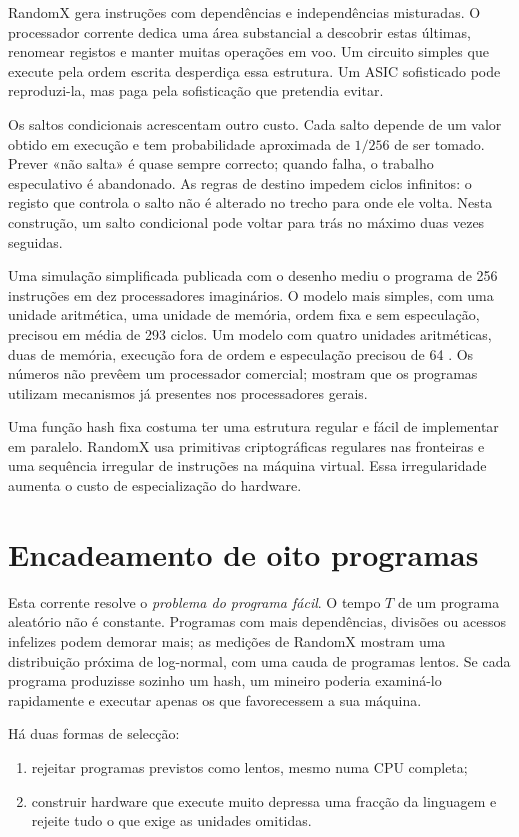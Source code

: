 RandomX gera instruções com dependências e independências misturadas. O
processador corrente dedica uma área substancial a descobrir estas últimas,
renomear registos e manter muitas operações em voo. Um circuito simples que
execute pela ordem escrita desperdiça essa estrutura. Um ASIC sofisticado
pode reproduzi-la, mas paga pela sofisticação que pretendia evitar.

Os saltos condicionais acrescentam outro custo. Cada salto depende de um
valor obtido em execução e tem probabilidade aproximada de \(1/256\) de ser
tomado. Prever «não salta» é quase sempre correcto; quando falha, o trabalho
especulativo é abandonado. As regras de destino impedem ciclos infinitos: o
registo que controla o salto não é alterado no trecho para onde ele volta.
Nesta construção, um salto condicional pode voltar para trás no máximo duas
vezes seguidas.

Uma simulação simplificada publicada com o desenho mediu o programa de 256
instruções em dez processadores imaginários. O modelo mais simples, com uma
unidade aritmética, uma unidade de memória, ordem fixa e sem especulação,
precisou em média de 293 ciclos. Um modelo com quatro unidades aritméticas,
duas de memória, execução fora de ordem e especulação precisou de 64
\cite{randomx-design-v1}. Os números não prevêem um processador comercial;
mostram que os programas utilizam mecanismos já presentes nos processadores
gerais.

Uma função hash fixa costuma ter uma estrutura regular e fácil de implementar
em paralelo. RandomX usa primitivas criptográficas regulares nas fronteiras e
uma sequência irregular de instruções na máquina virtual. Essa irregularidade
aumenta o custo de especialização do hardware.


\section{Encadeamento de oito programas}
\label{sec:randomx-eight-programs}

Esta corrente resolve o \emph{problema do programa fácil}. O tempo \(T\) de um
programa aleatório não é constante. Programas com mais dependências, divisões
ou acessos infelizes podem demorar mais; as medições de RandomX mostram uma
distribuição próxima de log-normal, com uma cauda de programas lentos. Se cada
programa produzisse sozinho um hash, um mineiro poderia examiná-lo rapidamente
e executar apenas os que favorecessem a sua máquina.

Há duas formas de selecção:
\begin{enumerate}
 \item rejeitar programas previstos como lentos, mesmo numa CPU completa;
 \item construir hardware que execute muito depressa uma fracção da linguagem
 e rejeite tudo o que exige as unidades omitidas.
\end{enumerate}

